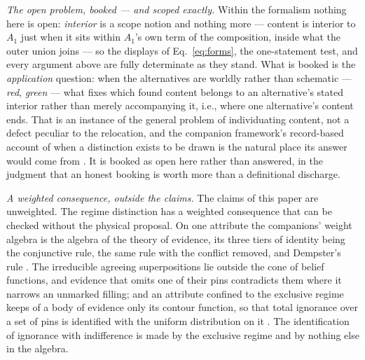 \documentclass[11pt]{article}
\begin{document}
\emph{The open problem, booked --- and scoped exactly.} Within the formalism nothing here is open: \emph{interior} is a scope notion and nothing more --- content is interior to $A_1$ just when it sits within $A_1$'s own term of the composition, inside what the outer union joins --- so the displays of Eq.~\eqref{eq:forms}, the one-statement test, and every argument above are fully determinate as they stand. What is booked is the \emph{application} question: when the alternatives are worldly rather than schematic --- \emph{red}, \emph{green} --- what fixes which found content belongs to an alternative's stated interior rather than merely accompanying it, i.e., where one alternative's content ends. That is an instance of the general problem of individuating content, not a defect peculiar to the relocation, and the companion framework's record-based account of when a distinction exists to be drawn is the natural place its answer would come from \parencite{Aethus}. It is booked as open here rather than answered, in the judgment that an honest booking is worth more than a definitional discharge.

\emph{A weighted consequence, outside the claims.} The claims of this paper are unweighted. The regime distinction has a weighted consequence that can be checked without the physical proposal. On one attribute the companions' weight algebra is the algebra of the theory of evidence, its three tiers of identity being the conjunctive rule, the same rule with the conflict removed, and Dempster's rule \parencite{AethusEvidence}. The irreducible agreeing superpositions lie outside the cone of belief functions, and evidence that omits one of their pins contradicts them where it narrows an unmarked filling; and an attribute confined to the exclusive regime keeps of a body of evidence only its contour function, so that total ignorance over a set of pins is identified with the uniform distribution on it \parencite{shafer1976, AethusEvidence}. The identification of ignorance with indifference is made by the exclusive regime and by nothing else in the algebra.
\end{document}
